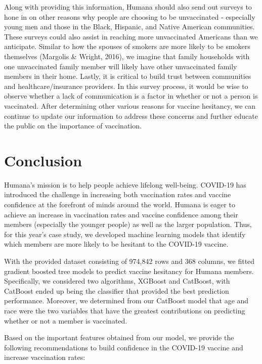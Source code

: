 \documentclass[
  12pt,
]{article}
\begin{document}
Along with providing this information, Humana should also send out
surveys to hone in on other reasons why people are choosing to be
unvaccinated - especially young men and those in the Black, Hispanic,
and Native American communities. These surveys could also assist in
reaching more unvaccinated Americans than we anticipate. Similar to how
the spouses of smokers are more likely to be smokers themselves
(Margolis \& Wright, 2016), we imagine that family households with one
unvaccinated family member will likely have other unvaccinated family
members in their home. Lastly, it is critical to build trust between
communities and healthcare/insurance providers. In this survey process,
it would be wise to observe whether a lack of communication is a factor
in whether or not a person is vaccinated. After determining other
various reasons for vaccine hesitancy, we can continue to update our
information to address these concerns and further educate the public on
the importance of vaccination.

\newpage

\hypertarget{conclusion}{%
\section{Conclusion}\label{conclusion}}

Humana's mission is to help people achieve lifelong well-being. COVID-19
has introduced the challenge in increasing both vaccination rates and
vaccine confidence at the forefront of minds around the world. Humana is
eager to achieve an increase in vaccination rates and vaccine confidence
among their members (especially the younger people) as well as the
larger population. Thus, for this year's case study, we developed
machine learning models that identify which members are more likely to
be hesitant to the COVID-19 vaccine.

With the provided dataset consisting of 974,842 rows and 368 columns, we
fitted gradient boosted tree models to predict vaccine hesitancy for
Humana members. Specifically, we considered two algorithms, XGBoost and
CatBoost, with CatBoost ended up being the classifier that provided the
best prediction performance. Moreover, we determined from our CatBoost
model that age and race were the two variables that have the greatest
contributions on predicting whether or not a member is vaccinated.

Based on the important features obtained from our model, we provide the
following recommendations to build confidence in the COVID-19 vaccine
and increase vaccination rates:
\end{document}
